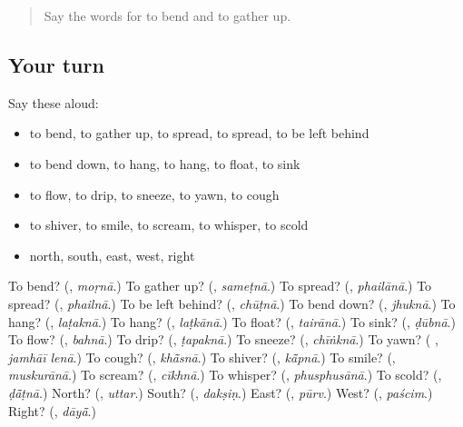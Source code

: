 \label{lesson:HI-R233-second-pass-words-from-chapters-229-233}



\begin{quote}
Say the words for to bend and to gather up.
\end{quote}

\subsection*{Your turn}
Say these aloud:

\begin{itemize}
\raggedright
  \item to bend, to gather up, to spread, to spread, to be left behind
  \item to bend down, to hang, to hang, to float, to sink
  \item to flow, to drip, to sneeze, to yawn, to cough
  \item to shiver, to smile, to scream, to whisper, to scold
  \item north, south, east, west, right
\end{itemize}

\begin{tcolorbox}[breakable,colback=teal!4,colframe=teal!35!black,title={Before you move on}]
To bend? (\textbf{}, \emph{moṛnā}.) To gather up? (\textbf{}, \emph{sameṭnā}.) To spread? (\textbf{}, \emph{phailānā}.) To spread? (\textbf{}, \emph{phailnā}.) To be left behind? (\textbf{}, \emph{chūṭnā}.) To bend down? (\textbf{}, \emph{jhuknā}.) To hang? (\textbf{}, \emph{laṭaknā}.) To hang? (\textbf{}, \emph{laṭkānā}.) To float? (\textbf{}, \emph{tairānā}.) To sink? (\textbf{}, \emph{ḍūbnā}.) To flow? (\textbf{}, \emph{bahnā}.) To drip? (\textbf{}, \emph{ṭapaknā}.) To sneeze? (\textbf{}, \emph{chīṅknā}.) To yawn? (\textbf{ }, \emph{jamhāī lenā}.) To cough? (\textbf{}, \emph{khā̃snā}.) To shiver? (\textbf{}, \emph{kā̃pnā}.) To smile? (\textbf{}, \emph{muskurānā}.) To scream? (\textbf{}, \emph{cīkhnā}.) To whisper? (\textbf{}, \emph{phusphusānā}.) To scold? (\textbf{}, \emph{ḍā̃ṭnā}.) North? (\textbf{}, \emph{uttar}.) South? (\textbf{}, \emph{dakṣiṇ}.) East? (\textbf{}, \emph{pūrv}.) West? (\textbf{}, \emph{paścim}.) Right? (\textbf{}, \emph{dāyā̃}.)
\end{tcolorbox}
